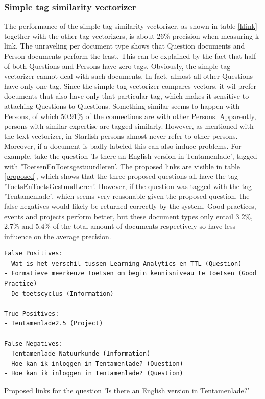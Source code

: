 \subsubsection{Simple tag similarity vectorizer}
The performance of the simple tag similarity vectorizer, as shown in table \ref{klink} together with the other tag vectorizers, is about 26\% precision when measuring k-link. The unraveling per document type shows that Question documents and Person documents perform the least. This can be explained by the fact that half of both Questions and Persons have zero tags. Obviously, the simple tag vectorizer cannot deal with such documents. In fact, almost all other Questions have only one tag. Since the simple tag vectorizer compares vectors, it wil prefer documents that also have only that particular tag, which makes it sensitive to attaching Questions to Questions. Something similar seems to happen with Persons, of which 50.91\% of the connections are with other Persons. Apparently, persons with similar expertise are tagged similarly. However, as mentioned with the text vectorizer, in Starfish persons almost never refer to other persons. Moreover, if a document is badly labeled this can also induce problems. For example, take the question 'Is there an English version in Tentamenlade', tagged with 'ToetsenEnToetsgestuurdleren'. The proposed links are visible in table \ref{proposed}, which shows that  the three proposed questions all have the tag 'ToetsEnToetsGestuudLeren'. However, if the question was tagged with the tag 'Tentamenlade', which seems very reasonable given the proposed question, the false negatives would likely be returned correctly by the system. Good practices, events and projects perform better, but these document types only entail 3.2\%, 2.7\% and 5.4\% of the total amount of documents respectively so have less influence on the average precision.

\begin{table}
\begin{lstlisting}
False Positives:
- Wat is het verschil tussen Learning Analytics en TTL (Question)
- Formatieve meerkeuze toetsen om begin kennisniveau te toetsen (Good Practice)
- De toetscyclus (Information)

True Positives:
- Tentamenlade2.5 (Project)

False Negatives:
- Tentamenlade Natuurkunde (Information)
- Hoe kan ik inloggen in Tentamenlade? (Question)
- Hoe kan ik inloggen in Tentamenlade? (Question)
\end{lstlisting}
\caption{Proposed links for the question 'Is there an English version in Tentamenlade?'}
\label{proposed}
\end{table}

